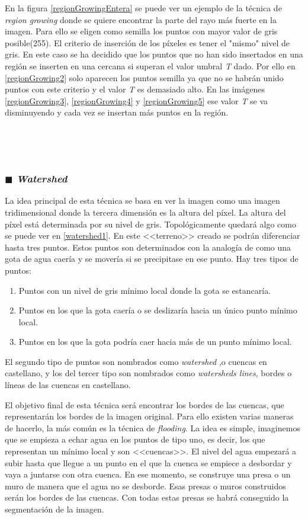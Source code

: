 En la figura \ref{regionGrowingEntera} se puede ver un ejemplo de la t\'{e}cnica de \textit{region growing} donde se quiere encontrar la parte del rayo m\'{a}s fuerte en la imagen. Para ello se eligen como semilla los puntos con mayor valor de gris posible(255). El criterio de inserci\'{o}n de los p\'{i}xeles es tener el "mismo" nivel de gris. En este caso se ha decidido que los puntos que no han sido insertados en una regi\'{o}n se inserten en una cercana si superan el valor umbral \textit{T} dado. Por ello en \ref{regionGrowing2} solo aparecen los puntos semilla ya que no se habr\'{a}n unido puntos con este criterio y el valor \textit{T} es demasiado alto. En las im\'{a}genes \ref{regionGrowing3}, \ref{regionGrowing4} y \ref{regionGrowing5} ese valor \textit{T} se va disminuyendo y cada vez se insertan m\'{a}s puntos en la regi\'{o}n. 

\

\

\subsubsection{$\blacksquare$ \quad \textit{Watershed}}

La idea principal de esta t\'{e}cnica se basa en ver la imagen como una imagen tridimensional donde la tercera dimensi\'{o}n es la altura del p\'{i}xel. La altura del p\'{i}xel est\'{a} determinada por su nivel de gris. Topol\'{o}gicamente quedar\'{a} algo como se puede ver en \ref{watershed1}. En este <<terreno>> creado se podr\'{a}n diferenciar hasta tres puntos. Estos puntos son determinados con la analog\'{i}a de como una gota de agua caer\'{i}a y se mover\'{i}a si se precipitase en ese punto. Hay tres tipos de puntos:
\begin{enumerate}
	\item Puntos con un nivel de gris m\'{i}nimo local donde la gota se estancar\'{i}a.
	\item Puntos en los que la gota caer\'{i}a o se deslizar\'{i}a hacia un \'{u}nico punto m\'{i}nimo local.
	\item Puntos en los que la gota podr\'{i}a caer hacia m\'{a}s de un punto m\'{i}nimo local.
\end{enumerate}
El segundo tipo de puntos son nombrados como \textit{watershed} ,o cuencas en castellano, y los del tercer tipo son nombrados como \textit{watersheds lines}, bordes o l\'{i}neas de las cuencas en castellano.

El objetivo final de esta t\'{e}cnica ser\'{a} encontrar los bordes de las cuencas, que representar\'{a}n los bordes de la imagen original. Para ello existen varias maneras de hacerlo, la m\'{a}s com\'{u}n es la t\'{e}cnica de \textit{flooding}. La idea es simple, imaginemos que se empieza a echar agua en los puntos de tipo uno, es decir, los que representan un m\'{i}nimo local y son <<cuencas>>. El nivel del agua empezar\'{a} a subir hasta que llegue a un punto en el que la cuenca se empiece a desbordar y vaya a juntarse con otra cuenca. En ese momento, se construye una presa o un muro de manera que el agua no se desborde. Esas presas o muros construidos ser\'{a}n los bordes de las cuencas. Con todas estas presas se habr\'{a} conseguido la segmentaci\'{o}n de la imagen.

